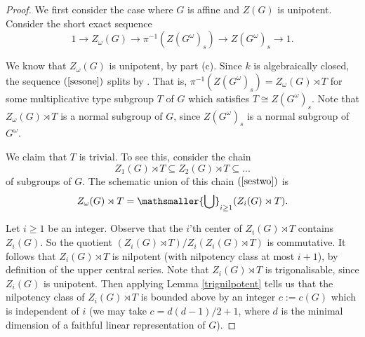 \documentclass[twoside,a4paper,reqno,11pt]{amsart}
\DeclareMathOperator{\sep}{s}
\theoremstyle{definition}
\begin{document}
\begin{proof}
\vspace{2mm}\noindent We first consider the case where $G$ is affine and $Z(G)$ is unipotent. Consider the short exact sequence \begin{equation}\label{sesone} 1\to Z_\omega(G)\to\pi^{-1}(Z(G^\omega)_s)\to Z(G^\omega)_s\to 1.\end{equation}

\noindent We know that $Z_\omega(G)$ is unipotent, by part (c). Since $k$ is algebraically closed, the sequence $(\ref{sesone})$ splits by \cite[XVII, Thm.\ 5.1.1(i)(a)]{SGA3}. That is, $\pi^{-1}(Z(G^\omega)_s)=Z_\omega(G)\rtimes T$ for some multiplicative type subgroup $T$ of $G$ which satisfies $T\cong Z(G^\omega)_s$. Note that $Z_\omega(G)\rtimes T$ is a normal subgroup of $G$, since $Z(G^\omega)_s$ is a normal subgroup of $G^\omega$. 

\vspace{2mm}\noindent We claim that $T$ is trivial. To see this, consider the chain \begin{equation}\label{sestwo} Z_1(G)\rtimes T\subseteq Z_2(G)\rtimes T\subseteq ... \end{equation} of %
subgroups of $G$. The schematic union of this chain $(\ref{sestwo})$ is \begin{equation}\label{schunses} Z_\omega(G)\rtimes T=\mathsmaller{\bigcup}_{i\geq 1}(Z_i(G)\rtimes T).\end{equation}

\vspace{1mm}\noindent Let $i\geq 1$ be an integer. Observe that the $i$'th center of $Z_i(G)\rtimes T$ contains $Z_i(G)$. %
So the quotient $(Z_i(G)\rtimes T)/Z_i(Z_i(G)\rtimes T)$ is commutative. It follows that $Z_i(G)\rtimes T$ is nilpotent (with nilpotency class at most $i+1$), by definition of the upper central series. %
Note that $Z_i(G)\rtimes T$ is trigonalisable, since $Z_i(G)$ is unipotent. Then applying Lemma \ref{trignilpotent} tells us that the nilpotency class of $Z_i(G)\rtimes T$ is bounded above by an integer $c:=c(G)$ which is independent of $i$ (we may take $c=d(d-1)/2+1$, where $d$ is the minimal dimension of a faithful linear representation of $G$).


\end{proof}
\end{document}

